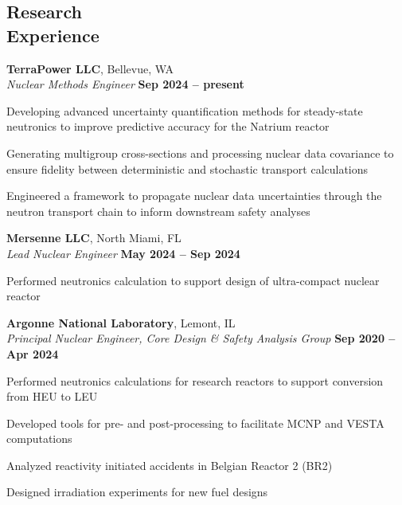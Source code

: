 \documentclass[margin,line]{resume}
\begin{document}
\begin{resume}
    \section{\mysidestyle Research\\Experience}    
	\textbf{TerraPower LLC}, Bellevue, WA\\
		\textsl{Nuclear Methods Engineer} \hfill \textbf{Sep 2024 -- present}   
	\begin{list2}
	\item Developing advanced uncertainty quantification methods for steady-state neutronics to improve predictive accuracy for the Natrium reactor
        \item Generating multigroup cross-sections and processing nuclear data covariance to ensure fidelity between deterministic and stochastic transport calculations
        \item Engineered a framework to propagate nuclear data uncertainties through the neutron transport chain to inform downstream safety analyses
	\end{list2}

    \textbf{Mersenne LLC}, North Miami, FL\\
		\textsl{Lead Nuclear Engineer} \hfill \textbf{May 2024 -- Sep 2024}   
	\begin{list2}
	\item Performed neutronics calculation to support design of ultra-compact nuclear reactor
	\end{list2}

    \textbf{Argonne National Laboratory}, Lemont, IL\\
		\textsl{Principal Nuclear Engineer, Core Design \& Safety Analysis Group} 
		\hfill \textbf{Sep 2020 -- Apr 2024}\\		
	\vspace{-4mm}
	\begin{list2}
	\item Performed neutronics calculations for research reactors to 
	support conversion from HEU to LEU
	\item Developed tools for pre- and post-processing 
	to facilitate MCNP and VESTA computations
	\item Analyzed reactivity initiated accidents in Belgian Reactor 2 (BR2)
	\item Designed irradiation experiments for new fuel designs
	\end{list2}


\end{resume}
\end{document}
